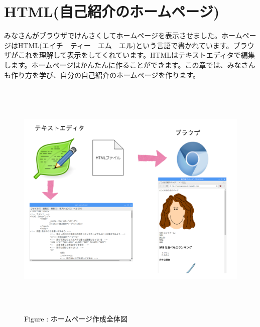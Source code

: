 \documentclass[a4paper,12pt]{jarticle}
\begin{document}
\section{HTML(自己紹介のホームページ)}
みなさんがブラウザでけんさくしてホームページを表示させました。ホームページはHTML(エイチ　ティー　エム　エル)という言語で書かれています。ブラウザがこれを理解して表示をしてくれています。HTMLはテキストエディタで編集します。ホームページはかんたんに作ることができます。この章では、みなさんも作り方を学び、自分の自己紹介のホームページを作ります。


\bigskip


\bigskip


\bigskip


\bigskip



\begin{figure}[hb]
  \centering
  \begin{minipage}{15.801cm}
    {\upshape
      \includegraphics[width=15.801cm,height=11.85cm]{textbook-img140.png}
      \newline
      Figure : ホームページ作成全体図}
  \end{minipage}
\end{figure}
\clearpage
\end{document}
